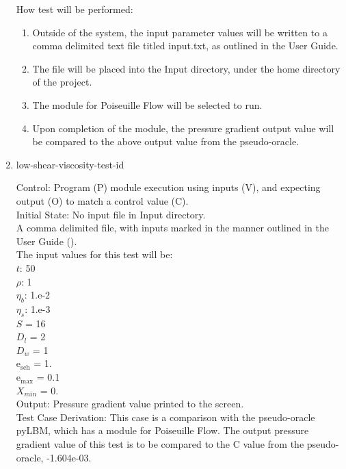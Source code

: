 \documentclass[12pt, titlepage]{article}
\newcounter{testcounter} %
\begin{document}
\begin{enumerate}
How test will be performed: 

\begin{enumerate}
\item Outside of the system, the input parameter values will be written to a
comma delimited text file titled input.txt, as outlined in the User Guide.
\item The file will be placed into the Input directory, under the home directory
of the project.
\item The module for Poiseuille Flow will be selected to run.
\item Upon completion of the module, the pressure gradient output value will be
compared to the above output value from the pseudo-oracle.
\end{enumerate}	

\item{low-shear-viscosity-test-id\thetestcounter \\}

Control: Program (P) module execution using inputs (V), and expecting output (O) to match a control value (C).\\
					
Initial State: No input file in Input directory.\\
					
A comma delimited file, with inputs marked in the manner outlined in the User
Guide (\citet{LBM_UserGuide_PM}).\\The input values for this test will be:\\
$t$: 50\\
$\rho$: 1\\
$\eta_b$: 1.e-2\\
$\eta_s$: 1.e-3\\
$S$ = 16\\
$D_{l}$ = 2\\
$D_{w}$ = 1\\
$\mathrm{e_{sch}}$ = 1.\\
$\mathrm{e_{max}}$ = 0.1\\
$X_{min}$ = 0.\\

Output: Pressure gradient value printed to the screen. \\ 

Test Case Derivation: This case is a comparison with the pseudo-oracle pyLBM,
which has a module for Poiseuille Flow. The output pressure gradient value of
this test is to be compared to the C value from the pseudo-oracle,
-1.604e-03.\\
					

\end{enumerate}
\end{document}

